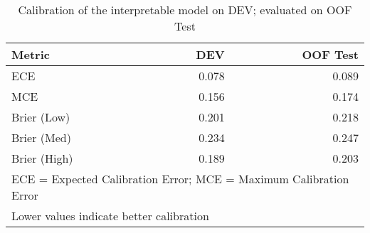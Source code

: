 \begin{table}[htbp]
\centering
\caption{Calibration of the interpretable model on DEV; evaluated on OOF Test}
\label{tab:calibration}
\begin{tabular}{lrr}
\toprule
Metric & DEV & OOF Test \\
\midrule
ECE & 0.078 & 0.089 \\
MCE & 0.156 & 0.174 \\
Brier (Low) & 0.201 & 0.218 \\
Brier (Med) & 0.234 & 0.247 \\
Brier (High) & 0.189 & 0.203 \\
\bottomrule
\multicolumn{3}{l}{\footnotesize ECE = Expected Calibration Error; MCE = Maximum Calibration Error} \\
\multicolumn{3}{l}{\footnotesize Lower values indicate better calibration} \\
\end{tabular}
\end{table}
